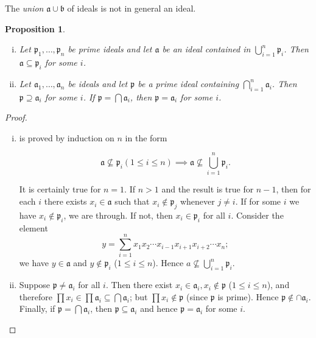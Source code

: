 \documentclass[class=book, crop=false]{standalone}
\newtheorem{proposition}[theorem]{Proposition}
\theoremstyle{definition}
\theoremstyle{remark}
\begin{document}
The \textit{union} $\mathfrak{a} \cup \mathfrak{b}$ of ideals is not in general
an ideal.
\begin{proposition}
  \begin{enumerate}[i)]
    \item Let $\mathfrak{p}_{1}, \ldots, \mathfrak{p}_{n}$ be prime ideals and
          let $\mathfrak{a}$ be an ideal contained in
          $\bigcup_{i=1}^{n} \mathfrak{p}_{i}$. Then
          $\mathfrak{a} \subseteq \mathfrak{p}_{i}$ for some $i$.
    \item Let $\mathfrak{a}_{1}, \ldots, \mathfrak{a}_{n}$ be ideals and let
          $\mathfrak{p}$ be a prime ideal containing
          $\bigcap_{i=1}^{n} \mathfrak{a}_{i}$. Then
          $\mathfrak{p} \supseteq \mathfrak{a}_{i}$ for some $i$. If
          $\mathfrak{p}=\bigcap \mathfrak{a}_{i}$, then
          $\mathfrak{p}=\mathfrak{a}_{i}$ for some $i$.
  \end{enumerate}
\end{proposition}
\begin{proof}
  \begin{enumerate}[i)]
    \item is proved by induction on $n$ in the form

\[
          \mathfrak{a} \nsubseteq \mathfrak{p}_{i}(1 \le i \le n) \implies \mathfrak{a} \nsubseteq \bigcup_{i=1}^{n} \mathfrak{p}_{i} .
          \]

          It is certainly true for $n=1$. If $n>1$ and the result is true for
          $n-1$, then for each $i$ there exists $x_{i} \in \mathfrak{a}$ such
          that $x_{i} \notin \mathfrak{p}_{j}$ whenever $j \neq i$. If for some
          $i$ we have $x_{i} \notin \mathfrak{p}_{i}$, we are through. If not,
          then $x_{i} \in \mathfrak{p}_{i}$ for all $i$. Consider the element
          \[
          y=\sum_{i=1}^{n} x_{1} x_{2} \cdots x_{i-1} x_{i+1} x_{i+2} \cdots x_{n};
          \]
          we have $y \in \mathfrak{a}$ and $y \notin \mathfrak{p}_{i}$
          ($1 \leq i \leq n$). Hence
          $a \nsubseteq \bigcup_{i=1}^{n} \mathfrak{p}_{i}$.
    \item Suppose $\mathfrak{p} \neq \mathfrak{a}_{i}$ for all $i$. Then there
          exist $x_{i} \in \mathfrak{a}_{i}, x_{i} \notin \mathfrak{p}$
          ($1 \leq i \leq n$), and therefore
          $\prod x_{i} \in \prod \mathfrak{a}_{i} \subseteq \bigcap \mathfrak{a}_{i}$;
          but $\prod x_{i} \notin \mathfrak{p}$ (since $\mathfrak{p}$ is prime).
          Hence $\mathfrak{p} \notin \cap \mathfrak{a}_{i}$. Finally, if
          $\mathfrak{p}=\bigcap \mathfrak{a}_{i}$, then
          $\mathfrak{p} \subseteq \mathfrak{a}_{i}$ and hence
          $\mathfrak{p}=\mathfrak{a}_{i}$ for some $i$.
  \end{enumerate}
\end{proof}
\end{document}
